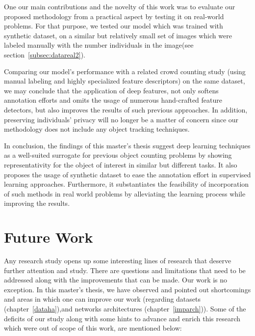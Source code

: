 \indent One our main contributions and the novelty of this work was to evaluate our proposed methodology from a practical aspect by testing it on real-world problems. For that purpose, we tested our model which was trained with synthetic dataset, on a similar but relatively small set of images which were labeled manually with the number individuals in the image(see section~\ref{subsec:datareal2}).    

Comparing our model's performance with a related crowd counting study (using manual labeling and highly specialized feature descriptors) on the same dataset, we may conclude that the application of deep features, not only softens annotation efforts and omits the usage of numerous hand-crafted feature detectors, but also improves the results of such previous approaches. In addition, preserving individuals' privacy will no longer be a matter of concern since our methodology does not include any object tracking techniques.    

\noindent In conclusion, the findings of this master's thesis suggest deep learning techniques as a well-suited surrogate for previous object counting problems by showing representativity for the object of interest in similar but different tasks. It also proposes the usage of synthetic dataset to ease the annotation effort in supervised learning approaches. Furthermore, it substantiates the feasibility of incorporation of such methods in real world problems by alleviating the learning process while improving the results.  

\section{Future Work}

Any research study opens up some interesting lines of research that deserve further attention and study. There are questions and limitations that need to be addressed along with the improvements that can be made. Our work is no exception. In this master's thesis, we have observed and pointed out shortcomings and areas in which one can improve our work (regarding datasets (chapter~\ref{dataha}),and networks architectures (chapter~\ref{imparch})). Some of the deficits of our study along with some hints to advance and enrich this research which were out of scope of this work, are mentioned below:

